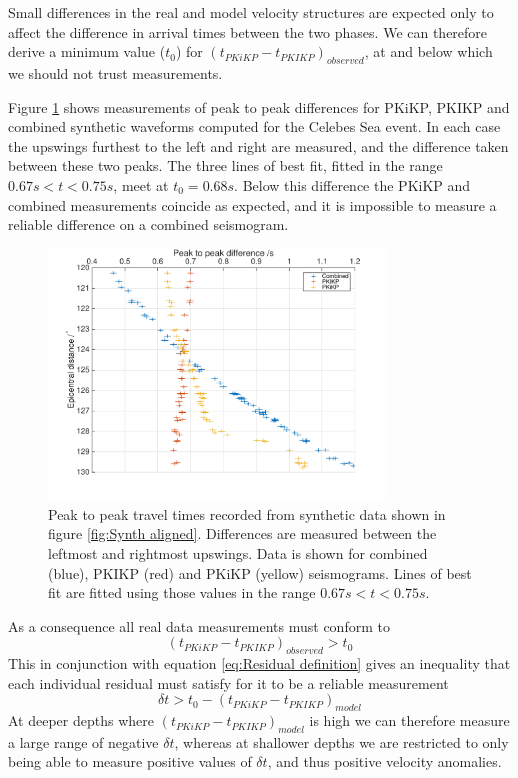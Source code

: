 \documentclass[11pt,a4paper]{article}
\begin{document}
Small differences in the real and model velocity structures are expected only to affect the difference in arrival times between the two phases. We can therefore derive a minimum value ($t_{0}$) for $ \left ( t_{PKiKP} - t_{PKIKP} \right )_{observed}$, at and below which we should not trust measurements.

Figure \ref{fig:Min distance} shows measurements of peak to peak differences for PKiKP, PKIKP and combined synthetic waveforms computed for the Celebes Sea event. In each case the upswings furthest to the left and right are measured, and the difference taken between these two peaks. The three lines of best fit, fitted in the range $0.67s < t < 0.75s$, meet at $ t_{0} = 0.68s$. Below this difference the PKiKP and combined measurements coincide as expected, and it is impossible to measure a reliable difference on a combined seismogram.

\begin{figure}
	\centering
	\includegraphics[width=0.8\textwidth]{figures/min_distance}
	\caption{Peak to peak travel times recorded from synthetic data shown in figure \ref{fig:Synth aligned}. Differences are measured between the leftmost and rightmost upswings. Data is shown for combined (blue), PKIKP (red) and PKiKP (yellow) seismograms. Lines of best fit are fitted using those values in the range $0.67s < t < 0.75s$.}
	\label{fig:Min distance}
\end{figure}

As a consequence all real data measurements must conform to
\begin{equation}
	\left ( t_{PKiKP} - t_{PKIKP} \right )_{observed} > t_{0}
\end{equation}
This in conjunction with equation \eqref{eq:Residual definition} gives an inequality that each individual residual must satisfy for it to be a reliable measurement
\begin{equation}
	\delta t > t_{0} -  \left ( t_{PKiKP} - t_{PKIKP} \right )_{model} 
\end{equation}
At deeper depths where $ \left ( t_{PKiKP} - t_{PKIKP} \right )_{model} $ is high we can therefore measure a large range of negative $\delta t$, whereas at shallower depths we are restricted to only being able to measure positive values of $\delta t$, and thus positive velocity anomalies.
\end{document}
